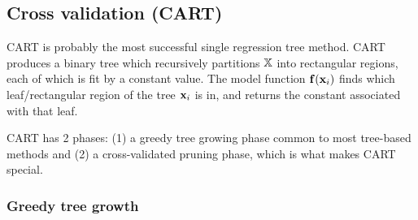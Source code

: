 \documentclass[10pt,openany]{article}
\numberwithin{definition}{section}
\numberwithin{example}{section}
\numberwithin{equation}{section}
\numberwithin{figure}{section}
\begin{document}
\subsection{\label{ite:Cross-validation}Cross validation (CART)}

CART \cite{breiman-friedman-olshen-stone-1984,hastie-tibshirani-friedman-2009}
is probably the most successful single regression tree method. CART
produces a binary tree which recursively partitions $\mathbb{X}$ into
rectangular regions, each of which is fit by a constant value. The
model function ${\mathbf f}({\mathbf x}_{i})$ finds which leaf/rectangular region of
the tree ${\mathbf x}_{i}$ is in, and returns the constant associated with
that leaf. 

CART has 2 phases: (1) a greedy tree growing phase common to most
tree-based methods and (2) a cross-validated pruning phase, which
is what makes CART special. 


\subsubsection{Greedy tree growth}
\end{document}
